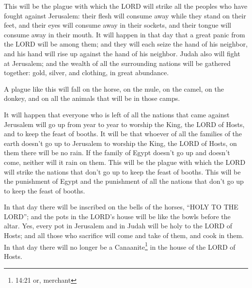 \myverse{}This will be the plague with which the LORD will strike all
the peoples who have fought against Jerusalem: their flesh will consume away while they stand on their
feet, and their eyes will consume away in their sockets, and their tongue will consume away in their mouth.
\myverse{}It will happen in that day that a great panic from the LORD will be among
them; and they will each seize the hand of his neighbor, and his hand will rise up against the hand of
his neighbor.
\myverse{}Judah also will fight at Jerusalem; and the wealth of all the surrounding
nations will be gathered together: gold, silver, and clothing, in great abundance.

\myverse{}A plague like this will fall on the horse, on the mule, on the
camel, on the donkey, and on all the animals that will be in those camps.

\myverse{}It will happen that everyone who is left of all the nations
that came against Jerusalem will go up from year to year to worship the King, the LORD of Hosts, and to
keep the feast of booths.
\myverse{}It will be that whoever of all the families of the earth doesn’t go up to
Jerusalem to worship the King, the LORD of Hosts, on them there will be no rain.
\myverse{}If the family of Egypt doesn’t go up and doesn’t come, neither will it rain
on them. This will be the plague with which the LORD will strike the nations that don’t go up to keep
the feast of booths.
\myverse{}This will be the punishment of Egypt and the punishment of all the nations
that don’t go up to keep the feast of booths.

\myverse{}In that day there will be inscribed on the bells of the horses,
“HOLY TO THE LORD”; and the pots in the LORD’s house will be like the bowls before the altar.
\myverse{}Yes, every pot in Jerusalem and in Judah will be holy to the LORD of Hosts;
and all those who sacrifice will come and take of them, and cook in them. In that day there will no longer
be a Canaanite\footnote{14:21 or, merchant} in the house of the LORD of Hosts.


